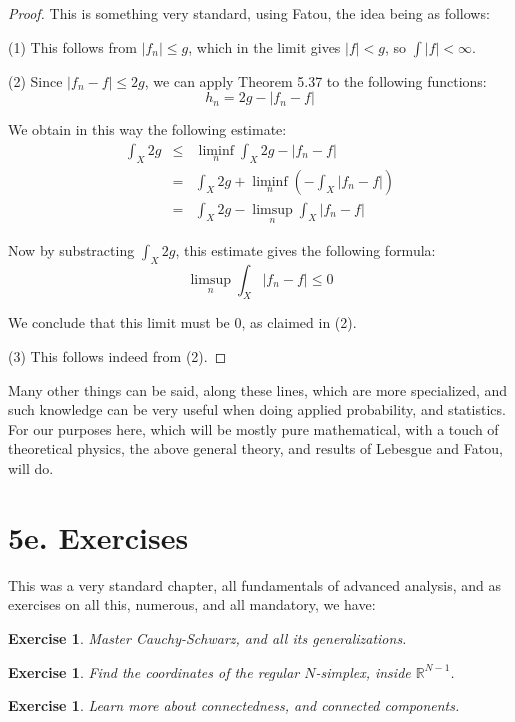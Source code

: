 \documentclass[12pt]{amsbook}
\newtheorem{exercise}[theorem]{Exercise}
\begin{document}
\begin{proof}
This is something very standard, using Fatou, the idea being as follows:

\medskip

(1) This follows from $|f_n|\leq g$, which in the limit gives $|f|<g$, so $\int|f|<\infty$.

\medskip

(2) Since $|f_n-f|\leq 2g$, we can apply Theorem 5.37 to the following functions:
$$h_n=2g-|f_n-f|$$

We obtain in this way the following estimate:
\begin{eqnarray*}
\int_X2g
&\leq&\liminf_n\int_X2g-|f_n-f|\\
&=&\int_X2g+\liminf_n\left(-\int_X|f_n-f|\right)\\
&=&\int_X2g-\limsup_n\int_X|f_n-f|
\end{eqnarray*}

Now by substracting $\int_X2g$, this estimate gives the following formula:
$$\limsup_n\int_X|f_n-f|\leq0$$

We conclude that this limit must be 0, as claimed in (2).

\medskip

(3) This follows indeed from (2).
\end{proof}

Many other things can be said, along these lines, which are more specialized, and such knowledge can be very useful when doing applied probability, and statistics. For our purposes here, which will be mostly pure mathematical, with a touch of theoretical physics, the above general theory, and results of Lebesgue and Fatou, will do.

\section*{5e. Exercises}

This was a very standard chapter, all fundamentals of advanced analysis, and as exercises on all this, numerous, and all mandatory, we have:

\begin{exercise}
Master Cauchy-Schwarz, and all its generalizations.
\end{exercise}

\begin{exercise}
Find the coordinates of the regular $N$-simplex, inside $\mathbb R^{N-1}$.
\end{exercise}

\begin{exercise}
Learn more about connectedness, and connected components.
\end{exercise}
\end{document}
